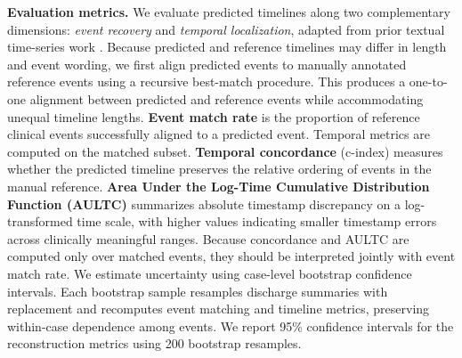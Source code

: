 \noindent\textbf{Evaluation metrics.} We evaluate predicted timelines along two complementary dimensions: \emph{event recovery} and \emph{temporal localization}, adapted from prior textual time-series work \cite{ch08:wang2025large,noroozizadeh2026reconstructing}. Because predicted and reference timelines may differ in length and event wording, we first align predicted events to manually annotated reference events using a recursive best-match procedure. This produces a one-to-one alignment between predicted and reference events while accommodating unequal timeline lengths. \textbf{Event match rate} is the proportion of reference clinical events successfully aligned to a predicted event. Temporal metrics are computed on the matched subset. \textbf{Temporal concordance} (c-index) measures whether the predicted timeline preserves the relative ordering of events in the manual reference. \textbf{Area Under the Log-Time Cumulative Distribution Function (AULTC)} summarizes absolute timestamp discrepancy on a log-transformed time scale, with higher values indicating smaller timestamp errors across clinically meaningful ranges. Because concordance and AULTC are computed only over matched events, they should be interpreted jointly with event match rate. 
We estimate uncertainty using case-level bootstrap confidence intervals.
Each bootstrap sample resamples discharge summaries with replacement and recomputes event matching and timeline metrics, preserving within-case dependence among events.
We report 95\% confidence intervals for the reconstruction metrics using 200 bootstrap resamples.









